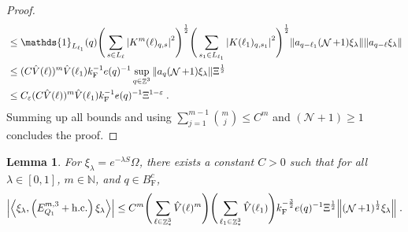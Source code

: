\documentclass[12pt,a4paper]{article}
\numberwithin{equation}{section}
\newcommand{\cN}{\mathcal{N}}
\newcommand{\NNN}{\mathbb{N}}
\newcommand{\1}{\mathbb{I}}
\newcommand{\F}{\mathrm{F}}
\DeclareMathOperator{\Z}{\mathbb{Z}}
\DeclareMathOperator{\NN}{\mathcal{N}}
\newcommand{\half}{\frac{1}{2}}
\newcommand{\eva}[1]{\left\langle #1 \right\rangle}
\theoremstyle{plain}
\newtheorem{lemma}[theorem]{Lemma}
\theoremstyle{definition}
\theoremstyle{remark}
\theoremstyle{plain}
\theoremstyle{definition}
\theoremstyle{remark}
\begin{document}
\begin{proof}
\begin{align}
	&\leq \mathds{1}_{L_{\ell_1}}(q)
		\Bigg(\sum_{s \in L_{\ell}} \abs{K^m(\ell)_{q,s}}^2\Bigg)^\half \Bigg(\sum_{s_1 \in L_{\ell_1}} \abs{K(\ell_1)_{q,s_1}}^2\Bigg)^\half \norm{ a_{q-\ell_1} (\NN+1)\xi_\lambda} \norm{ a_{q-\ell}\xi_\lambda }\nonumber\\
	&\leq (C \hat{V}(\ell))^m \hat{V}(\ell_1) k_{\F}^{-1} e(q)^{-1} \sup_{q \in \Z^3}\norm{ a_{q} (\NN+1) \xi_\lambda}\Xi^\half\nonumber\\
	&\leq C_\varepsilon (C \hat{V}(\ell))^m \hat{V}(\ell_1) k_{\F}^{-1} e(q)^{-1} \Xi^{1-\varepsilon} \;. \label{eq:estEQ1113}
\end{align}
Summing up all bounds and using $\sum_{j=1}^{m-1} {{m}\choose j} \le C^m $ and $ (\cN+1) \ge 1 $ concludes the proof.
\end{proof}



\begin{lemma} \label{lem:EQ112}
For $\xi_\lambda = e^{-\lambda S} \Omega$, there exists a constant $ C > 0 $ such that for all $ \lambda \in [0,1] $, $ m \in \NNN $, and $ q \in B_{\F}^c $,
\begin{equation}
	\abs{\eva{\xi_\lambda,\left(E^{m,3}_{Q_1}+\mathrm{h.c.}\right) \xi_\lambda }}\nonumber
	\leq C^m \Bigg(\sum_{\ell\in \Z^3_*} \hat{V}(\ell)^m \Bigg)
		\Bigg(\sum_{\ell_1\in \Z^3_*} \hat{V}(\ell_1) \Bigg)
		k_{\F}^{-\frac{3}{2}} e(q)^{-1} \Xi^{\half}
		\norm{(\NN+1)^\half \xi_\lambda } \;. \label{eq:estEQ112}
\end{equation}
\end{lemma}
\end{document}
